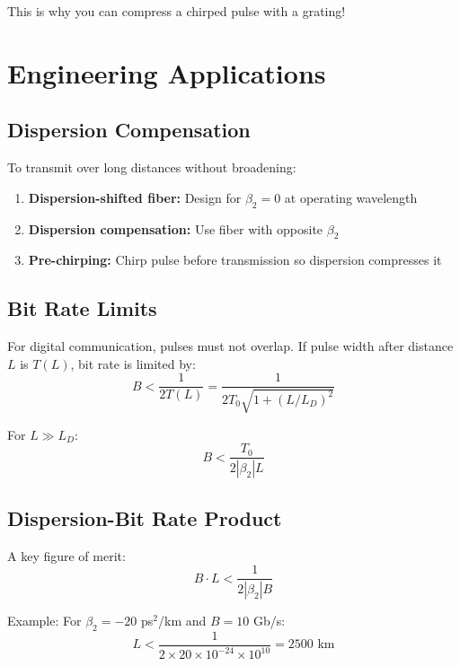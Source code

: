\documentclass[12pt]{article}
\begin{document}
This is why you can compress a chirped pulse with a grating!

\section{Engineering Applications}

\subsection{Dispersion Compensation}

To transmit over long distances without broadening:

\begin{enumerate}
\item \textbf{Dispersion-shifted fiber:} Design for $\beta_2 = 0$ at operating wavelength
\item \textbf{Dispersion compensation:} Use fiber with opposite $\beta_2$
\item \textbf{Pre-chirping:} Chirp pulse before transmission so dispersion compresses it
\end{enumerate}

\subsection{Bit Rate Limits}

For digital communication, pulses must not overlap.
If pulse width after distance $L$ is $T(L)$, bit rate is limited by:
\begin{equation}
B < \frac{1}{2T(L)} = \frac{1}{2T_0\sqrt{1 + (L/L_D)^2}}
\end{equation}

For $L \gg L_D$:
\begin{equation}
B < \frac{T_0}{2|\beta_2|L}
\end{equation}

\subsection{Dispersion-Bit Rate Product}

A key figure of merit:
\begin{equation}
B \cdot L < \frac{1}{2|\beta_2|B}
\end{equation}

Example: For $\beta_2 = -20$ ps$^2$/km and $B = 10$ Gb/s:
\begin{equation}
L < \frac{1}{2 \times 20 \times 10^{-24} \times 10^{10}} = 2500 \text{ km}
\end{equation}
\end{document}

